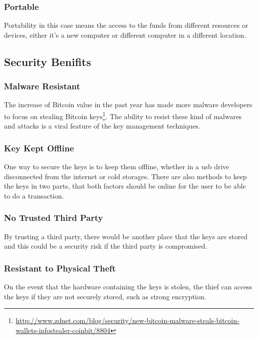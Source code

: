 \subsubsection{Portable}
\label{Portable}
Portability in this case means the access to the funds from different resources or devices, either it's a new computer or different computer in a different location.



\subsection{Security Benifits}

\subsubsection{Malware Resistant}
\label{Malware Resistant}
The increase of Bitcoin value in the past year has made more malware developers to focus on stealing Bitcoin keys\footnote{\url{http://www.zdnet.com/blog/security/new-bitcoin-malware-steals-bitcoin-wallets-infostealer-coinbit/8804}}. The ability to resist these kind of malwares and attacks is a viral feature of the key management techniques.

\subsubsection{Key Kept Offline} 
\label{Key Kept Offline}
One way to secure the keys is to keep them offline, whether in a usb drive disconnected from the internet or cold storages. There are also methods to keep the keys in two parts, that both factors should be online for the user to be able to do a transaction.

\subsubsection{No Trusted Third Party}
\label{No Trusted Third Party}
By trusting a third party, there would be another place that the keys are stored and this could be a security risk if the third party is compromised.

\subsubsection{Resistant to Physical Theft}
\label{Resistant to Physical Theft}
On the event that the hardware containing the keys is stolen, the thief can access the keys if they are not securely stored, such as strong encryption.

